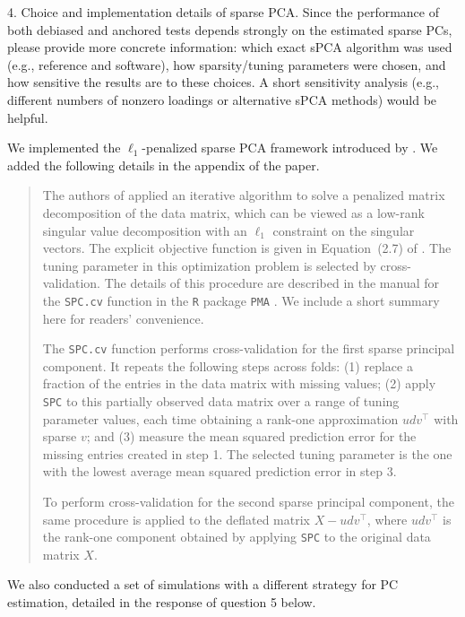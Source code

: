 \documentclass{article}
\theoremstyle{definition}
\begin{document}
\begin{shaded}
4. Choice and implementation details of sparse PCA.
Since the performance of both debiased and anchored tests depends strongly on the estimated sparse PCs, please provide more concrete information: which exact sPCA algorithm was used (e.g., reference and software), how sparsity/tuning parameters were chosen, and how sensitive the results are to these choices. A short sensitivity analysis (e.g., different numbers of nonzero loadings or alternative sPCA methods) would be helpful.
\end{shaded}

We implemented the $\ell_1$-penalized sparse PCA framework introduced by \cite{witten2009penalized}. We added the following details in the appendix of the paper. 

\begin{quote}
The authors of \cite{witten2009penalized} applied an iterative algorithm to solve a penalized matrix decomposition of the data matrix, which can be viewed as a low-rank singular value decomposition with an $\ell_1$ constraint on the singular vectors. The explicit objective function is given in Equation~(2.7) of \cite{witten2009penalized}. The tuning parameter in this optimization problem is selected by cross-validation. The details of this procedure are described in the manual for the \texttt{SPC.cv} function in the \texttt{R} package \texttt{PMA} \cite{PMA}. We include a short summary here for readers' convenience.

The \texttt{SPC.cv} function performs cross-validation for the first sparse principal component. It repeats the following steps across folds: (1) replace a fraction of the entries in the data matrix with missing values; (2) apply \texttt{SPC} to this partially observed data matrix over a range of tuning parameter values, each time obtaining a rank-one approximation $udv^\top$ with sparse $v$; and (3) measure the mean squared prediction error for the missing entries created in step 1. The selected tuning parameter is the one with the lowest average mean squared prediction error in step 3.

To perform cross-validation for the second sparse principal component, the same procedure is applied to the deflated matrix $X-udv^\top$, where $udv^\top$ is the rank-one component obtained by applying \texttt{SPC} to the original data matrix $X$.
\end{quote}

We also conducted a set of simulations with a different strategy for PC estimation, detailed in the response of question 5 below. 
\end{document}

